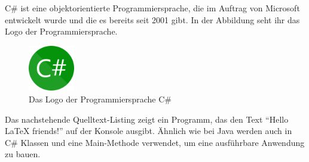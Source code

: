 C\# ist eine objektorientierte Programmiersprache, die im Auftrag von Microsoft entwickelt wurde und die es bereits seit 2001 gibt. In der Abbildung seht ihr das Logo der Programmiersprache. 

\begin{figure}[H]
	\caption{Das Logo der Programmiersprache C\#}
	\centering
	\includegraphics[width=2cm]{exercises/references/csharp.png}
\end{figure}

Das nachstehende Quelltext-Listing zeigt ein Programm, das den Text \enquote{Hello LaTeX friends!} auf der Konsole ausgibt. Ähnlich wie bei Java werden auch in C\# Klassen und eine Main-Methode verwendet, um eine ausführbare Anwendung zu bauen. 

\inputminted[breaklines, linenos=true]{csharp}{exercises/references/HelloLateXFriends.cs}




